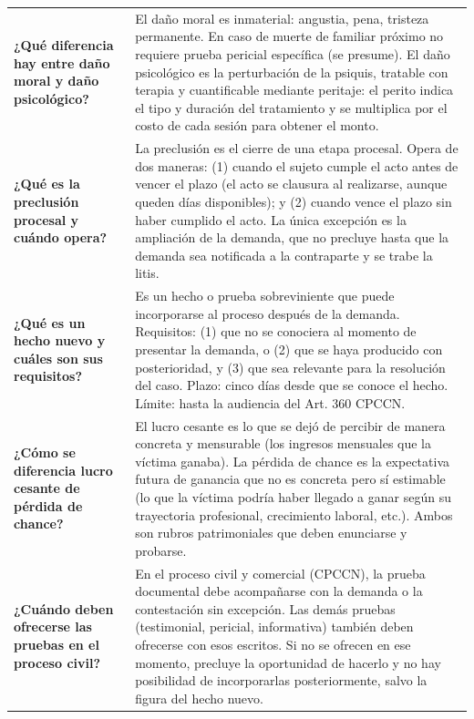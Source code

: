 \documentclass[12pt,oneside]{book}
\begin{document}
\begin{table}[H]
\begin{tabularx}{\textwidth}{
    >{\raggedright\arraybackslash}p{}
    >{\raggedright\arraybackslash}X
}
\textbf{¿Qué diferencia hay entre daño moral y daño psicológico?} &
El daño moral es inmaterial: angustia, pena, tristeza permanente. En caso de muerte de familiar próximo no requiere prueba pericial específica (se presume). El daño psicológico es la perturbación de la psiquis, tratable con terapia y cuantificable mediante peritaje: el perito indica el tipo y duración del tratamiento y se multiplica por el costo de cada sesión para obtener el monto. \\

\textbf{¿Qué es la preclusión procesal y cuándo opera?} &
La preclusión es el cierre de una etapa procesal. Opera de dos maneras: (1) cuando el sujeto cumple el acto antes de vencer el plazo (el acto se clausura al realizarse, aunque queden días disponibles); y (2) cuando vence el plazo sin haber cumplido el acto. La única excepción es la ampliación de la demanda, que no precluye hasta que la demanda sea notificada a la contraparte y se trabe la litis. \\

\textbf{¿Qué es un hecho nuevo y cuáles son sus requisitos?} &
Es un hecho o prueba sobreviniente que puede incorporarse al proceso después de la demanda. Requisitos: (1) que no se conociera al momento de presentar la demanda, o (2) que se haya producido con posterioridad, y (3) que sea relevante para la resolución del caso. Plazo: cinco días desde que se conoce el hecho. Límite: hasta la audiencia del Art. 360 CPCCN. \\

\textbf{¿Cómo se diferencia lucro cesante de pérdida de chance?} &
El lucro cesante es lo que se dejó de percibir de manera concreta y mensurable (los ingresos mensuales que la víctima ganaba). La pérdida de chance es la expectativa futura de ganancia que no es concreta pero sí estimable (lo que la víctima podría haber llegado a ganar según su trayectoria profesional, crecimiento laboral, etc.). Ambos son rubros patrimoniales que deben enunciarse y probarse. \\

\textbf{¿Cuándo deben ofrecerse las pruebas en el proceso civil?} &
En el proceso civil y comercial (CPCCN), la prueba documental debe acompañarse con la demanda o la contestación sin excepción. Las demás pruebas (testimonial, pericial, informativa) también deben ofrecerse con esos escritos. Si no se ofrecen en ese momento, precluye la oportunidad de hacerlo y no hay posibilidad de incorporarlas posteriormente, salvo la figura del hecho nuevo. \\


\end{tabularx}
\end{table}
\end{document}
